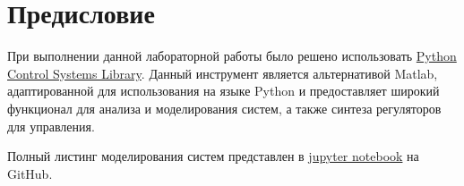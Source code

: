 \tableofcontents
\section*{Предисловие}
При выполнении данной лабораторной работы было решено использовать 
\href{https://python-control.readthedocs.io/en/0.9.4/}{Python Control Systems Library}.
Данный инструмент является альтернативой Matlab, адаптированной для использования на 
языке Python и предоставляет широкий функционал для анализа и моделирования систем,
а также синтеза регуляторов для управления.

Полный листинг моделирования систем представлен в \href{https://github.com/diuzhevVlad/control-theory-itmo-fall-2023/blob/main/Lab4/Lab4.ipynb}{jupyter notebook} на GitHub.

\pagebreak

